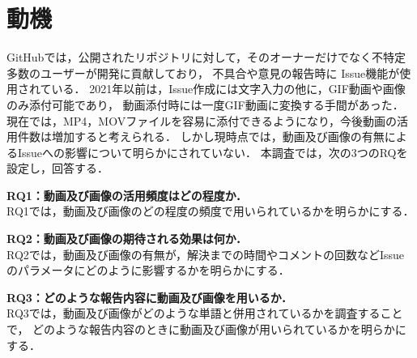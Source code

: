 \section{動機\label{motivation}}

GitHubでは，公開されたリポジトリに対して，そのオーナーだけでなく不特定多数のユーザーが開発に貢献しており，
不具合や意見の報告時に Issue機能が使用されている．
2021年以前は，Issue作成には文字入力の他に，GIF動画や画像のみ添付可能であり，
動画添付時には一度GIF動画に変換する手間があった．
現在では，MP4，MOVファイルを容易に添付できるようになり，今後動画の活用件数は増加すると考えられる．
しかし現時点では，動画及び画像の有無によるIssueへの影響について明らかにされていない．
本調査では，次の3つのRQを設定し，回答する．

\textbf{RQ1：動画及び画像の活用頻度はどの程度か．}\\
RQ1では，動画及び画像のどの程度の頻度で用いられているかを明らかにする．

\textbf{RQ2：動画及び画像の期待される効果は何か．}\\
RQ2では，動画及び画像の有無が，解決までの時間やコメントの回数などIssueのパラメータにどのように影響するかを明らかにする．

\textbf{RQ3：どのような報告内容に動画及び画像を用いるか．}\\
RQ3では，動画及び画像がどのような単語と併用されているかを調査することで，
どのような報告内容のときに動画及び画像が用いられているかを明らかにする．